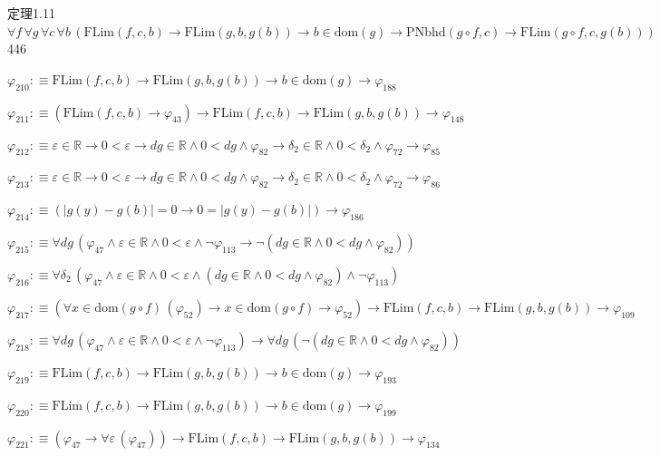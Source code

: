 \begin{fullproof}{定理1.11}{$\forall f\,\forall g\,\forall c\,\forall b\,(\mathrm{FLim}(f,c,b) \to \mathrm{FLim}(g,b,g(b)) \to b \in \mathrm{dom}(g) \to \mathrm{PNbhd}(g \circ f,c) \to \mathrm{FLim}(g \circ f,c,g(b)))$}{446}
\begin{abbrevlist}
\item $\varphi_{210} :\equiv \mathrm{FLim}(f,c,b) \to \mathrm{FLim}(g,b,g(b)) \to b \in \mathrm{dom}(g) \to \varphi_{188}$
\item $\varphi_{211} :\equiv (\mathrm{FLim}(f,c,b) \to \varphi_{43}) \to \mathrm{FLim}(f,c,b) \to \mathrm{FLim}(g,b,g(b)) \to \varphi_{148}$
\item $\varphi_{212} :\equiv \varepsilon \in \mathbb{R} \to 0 < \varepsilon \to \mathit{dg} \in \mathbb{R} \land 0 < \mathit{dg} \land \varphi_{82} \to \delta_{2} \in \mathbb{R} \land 0 < \delta_{2} \land \varphi_{72} \to \varphi_{85}$
\item $\varphi_{213} :\equiv \varepsilon \in \mathbb{R} \to 0 < \varepsilon \to \mathit{dg} \in \mathbb{R} \land 0 < \mathit{dg} \land \varphi_{82} \to \delta_{2} \in \mathbb{R} \land 0 < \delta_{2} \land \varphi_{72} \to \varphi_{86}$
\item $\varphi_{214} :\equiv (\lvert g(y) - g(b) \rvert = 0 \to 0 = \lvert g(y) - g(b) \rvert) \to \varphi_{186}$
\item $\varphi_{215} :\equiv \forall \mathit{dg}\,(\varphi_{47} \land \varepsilon \in \mathbb{R} \land 0 < \varepsilon \land \neg \varphi_{113} \to \neg (\mathit{dg} \in \mathbb{R} \land 0 < \mathit{dg} \land \varphi_{82}))$
\item $\varphi_{216} :\equiv \forall \delta_{2}\,(\varphi_{47} \land \varepsilon \in \mathbb{R} \land 0 < \varepsilon \land (\mathit{dg} \in \mathbb{R} \land 0 < \mathit{dg} \land \varphi_{82}) \land \neg \varphi_{113})$
\item $\varphi_{217} :\equiv (\forall x \in \mathrm{dom}(g \circ f)\,(\varphi_{52}) \to x \in \mathrm{dom}(g \circ f) \to \varphi_{52}) \to \mathrm{FLim}(f,c,b) \to \mathrm{FLim}(g,b,g(b)) \to \varphi_{109}$
\item $\varphi_{218} :\equiv \forall \mathit{dg}\,(\varphi_{47} \land \varepsilon \in \mathbb{R} \land 0 < \varepsilon \land \neg \varphi_{113}) \to \forall \mathit{dg}\,(\neg (\mathit{dg} \in \mathbb{R} \land 0 < \mathit{dg} \land \varphi_{82}))$
\item $\varphi_{219} :\equiv \mathrm{FLim}(f,c,b) \to \mathrm{FLim}(g,b,g(b)) \to b \in \mathrm{dom}(g) \to \varphi_{193}$
\item $\varphi_{220} :\equiv \mathrm{FLim}(f,c,b) \to \mathrm{FLim}(g,b,g(b)) \to b \in \mathrm{dom}(g) \to \varphi_{199}$
\item $\varphi_{221} :\equiv (\varphi_{47} \to \forall \varepsilon\,(\varphi_{47})) \to \mathrm{FLim}(f,c,b) \to \mathrm{FLim}(g,b,g(b)) \to \varphi_{134}$

\end{abbrevlist}
\end{fullproof}
